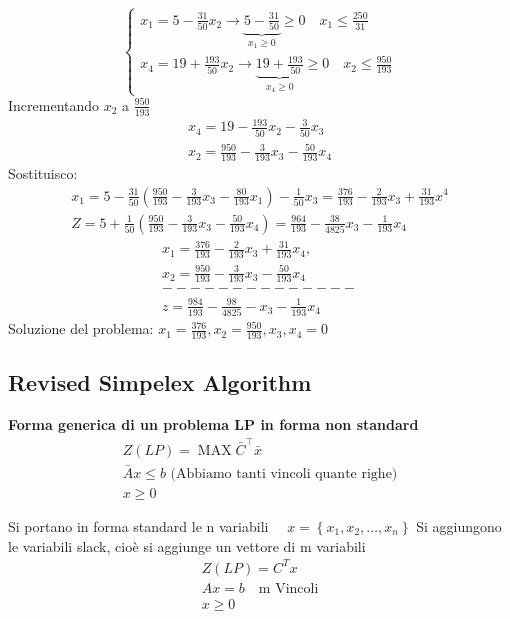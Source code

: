 {$$
\begin{cases}
    x_{1}=5-\frac{31}{50}x_{2} \longrightarrow \underbrace{5-\frac{31}{50}}_{x_1\geq 0}\geqslant 0 \quad x_{1} \leq \frac{250}{31} \quad \\ 
    x_{4}=19+\frac{193}{50} x_{2} \longrightarrow \underbrace{19+\frac{193}{50} }_{x_{4} \geqslant 0} \geqslant 0 \quad x_{2} \leq\frac{950}{193}    
\end{cases}
$$
Incrementando $x_2$ a $\frac{950}{193}$
\begin{align*}
x_{4}=19-\frac{193}{50} x_{2}-\frac{3}{50} x_{3}\\
x_{2}=\frac{950}{193}-\frac{3}{193} x_{3}-\frac{50}{193} x_{4}
\end{align*}
Sostituisco:
\begin{align*}
    x_{1}=5-\frac{31}{50}\left(\frac{950}{193}-\frac{3}{193} x_{3}-\frac{80}{193} x_{1}\right)-\frac{1}{50} x_{3}=\frac{376}{193}-\frac{2}{193} x_{3}+\frac{31}{193} x^{4}\\ 
    Z=5+\frac{1}{50}\left(\frac{950}{193}-\frac{3}{193} x_{3}-\frac{50}{193} x_{4}\right)=\frac{964}{193}-\frac{38}{4825} x_{3}-\frac{1}{193} x_{4}
\end{align*}
\begin{align*}
    x_{1}=\frac{376}{193}-\frac{2}{193} x_{3}+\frac{31}{193} x_{4}, \quad \\ 
    x_2=\frac{950}{193}-\frac{3}{193}x_3-\frac{50}{193}x_4\\ 
    --------------\\
     z=\frac{984}{193}-\frac{98}{4825}-x_{3}-\frac{1}{193} x_{4}
\end{align*}
Soluzione del problema:
$x_{1}=\frac{376}{193}, x_{2}=\frac{950}{193},x_3,x_4=0$
}
\subsection{Revised Simpelex Algorithm}
\textbf{Forma generica di un problema LP in forma non standard}
$$
\begin{gathered}
    Z(L P)=\operatorname{MAX} \bar{C}^{\top} \bar{x} \\
    \bar{A} x \leqslant b \text{ (Abbiamo tanti vincoli quante righe)}\\
    x \geqslant 0
\end{gathered}
$$

Si portano in forma standard le n variabili $\quad x=\left\{x_{1}, x_{2}, \ldots, x_{n}\right\}$
Si aggiungono le variabili slack, cioè si aggiunge un vettore di m variabili
\begin{align*}
Z(LP)=C^Tx\\
A x=b \quad \text{m Vincoli}\\
x \geqslant 0
\end{align*}

